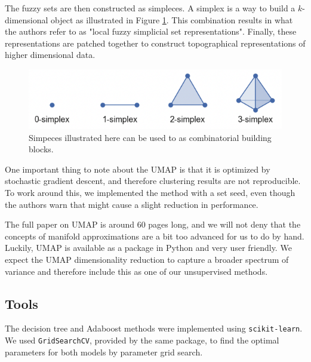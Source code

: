 The fuzzy sets are then constructed as simpleces. A simplex is a way to build a $k$-dimensional object as illustrated in Figure \ref{fig:simpleces}. This combination results in what the authors refer to as "local fuzzy simplicial set representations". Finally, these representations are patched together to construct topographical representations of higher dimensional data. 

\begin{figure}[H]
    \centering
    \includegraphics[width=1\linewidth]{examples/tests_eb/figs/Skjermbilde 2024-12-05 kl. 16.56.40.png}
    \caption{Simpeces illustrated here can be used to as combinatorial building blocks.}
    \label{fig:simpleces}
\end{figure}

One important thing to note about the UMAP is that it is optimized by stochastic gradient descent, and therefore clustering results are not reproducible. To work around this, we implemented the method with a set seed, even though the authors warn that might cause a slight reduction in performance. 

The full paper on UMAP is around 60 pages long, and we will not deny that the concepts of manifold approximations are a bit too advanced for us to do by hand. Luckily, UMAP is available as a package in Python and very user friendly. We expect the UMAP dimensionality reduction to capture a broader spectrum of variance and therefore include this as one of our unsupervised methods.

\subsection{Tools} \label{subsec:tools}
The decision tree and Adaboost methods were implemented using \verb|scikit-learn|. We used \verb|GridSearchCV|, provided by the same package, to find the optimal parameters for both models by parameter grid search.



%

%
%

%
%
